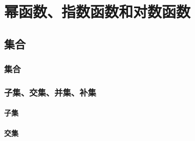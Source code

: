 \chapter{幂函数、指数函数和对数函数}
\section{集合}
\subsection{集合}
\begin{Practice}
  \begin{question}
    \item 
    \item 
    \item 
    \item 
    \item 
    \item 
    \item 
    \item 
    \item 
    \item 
    \item 
    \item 
    \item 
    \item 
  \end{question}
\end{Practice}
\subsection{子集、交集、并集、补集}
\subsubsection{子集}
\subsubsection{交集}
\begin{Practice}
  \begin{question}
    \item 
    \item 
    \item 
    \item 
    \item 
    \item 
    \item 
    \item 
    \item 
    \item 
    \item 
    \item 
  \end{question}
\end{Practice}

